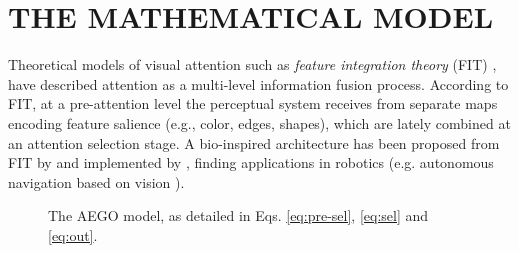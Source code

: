 \documentclass[letterpaper, 10 pt, conference]{ieeeconf}  %
\begin{document}
	
	\section{THE MATHEMATICAL MODEL}	
	\label{sec:model}
	
	Theoretical models of visual attention such as \textit{feature integration theory} (FIT) \cite{treisman1980}, have described attention as a multi-level information fusion process. According to FIT, at a pre-attention level the perceptual system receives from separate maps encoding feature salience (e.g., color, edges, shapes), which are lately combined at an attention selection stage. A bio-inspired architecture has been proposed from FIT by \cite{koch1985} and implemented by \cite{itti1998}, finding applications in robotics (e.g. autonomous navigation based on vision \cite{siagian2014}).

	\begin{figure}[h!]
		\caption{The AEGO model, as detailed in Eqs. \eqref{eq:pre-sel}, \eqref{eq:sel} and \eqref{eq:out}.}
		\label{fig:AEGO}
	\end{figure}
\end{document}
